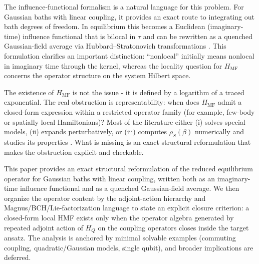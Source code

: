 The influence-functional formalism is a natural language for this problem.
For Gaussian baths with linear coupling, it provides an exact route to
integrating out bath degrees of freedom\cite{feynmanTheoryGeneralQuantum1963a,caldeiraQuantumTunnellingDissipative1983a,grabertQuantumBrownianMotion1988}.
In equilibrium this becomes a Euclidean (imaginary-time) influence functional
that is bilocal in $\tau$ and can be rewritten as a quenched Gaussian-field
average via Hubbard--Stratonovich transformations
\cite{hubbardCalculationPartitionFunctions1959a,stratonovich1957QDistro,stockburgerExactNumberRepresentation2002,moixEquilibriumreducedDensityMatrix2012,chenRigorousStochasticMatrix2014}.
This formulation clarifies an important distinction: ``nonlocal'' initially
means nonlocal in imaginary time through the kernel, whereas the locality
question for $H_{\mathrm{MF}}$ concerns the operator structure on the system
Hilbert space.

The existence of $H_{\mathrm{MF}}$ is not the issue - it is defined by a
logarithm of a traced exponential. The real obstruction is representability:
when does $H_{\mathrm{MF}}$ admit a closed-form expression within a restricted
operator family (for example, few-body or spatially local Hamiltonians)? Most of
the literature either (i) solves special models, (ii) expands perturbatively, or
(iii) computes $\rho_S(\beta)$ numerically and studies its properties
\cite{burkeStructureHamiltonianMean2024,duGeneralizedHamiltonianMeanforce2025a,cresserWeakUltrastrongCoupling2021a}.
What is missing is an exact structural reformulation that makes the obstruction
explicit and checkable.

This paper provides an exact structural reformulation of the reduced equilibrium
operator for Gaussian baths with linear coupling, written both as an
imaginary-time influence functional and as a quenched Gaussian-field average.
We then organize the operator content by the adjoint-action hierarchy and
Magnus/BCH/Lie-factorization language to state an explicit closure criterion: a
closed-form local HMF exists only when the operator algebra generated by
repeated adjoint action of $H_Q$ on the coupling operators closes inside the
target ansatz. The analysis is anchored by minimal solvable examples (commuting
coupling, quadratic/Gaussian models, single qubit), and broader implications are
deferred.

